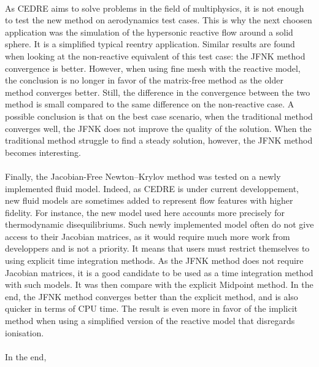   \paragraph{}
  As CEDRE aims to solve problems in the field of multiphysics, it is not enough to test the new method on aerodynamics test cases.
  This is why the next choosen application was the simulation of the hypersonic reactive flow around a solid sphere.
  It is a simplified typical reentry application.
  Similar results are found when looking at the non-reactive equivalent of this test case: the JFNK method convergence is better.
  However, when using fine mesh with the reactive model, the conclusion is no longer in favor of the matrix-free method as the older method converges better.
  Still, the difference in the convergence between the two method is small compared to the same difference on the non-reactive case.
  A possible conclusion is that on the best case scenario, when the traditional method converges well, the JFNK does not improve the quality of the solution.
  When the traditional method struggle to find a steady solution, however, the JFNK method becomes interesting.

  \paragraph{}
  Finally, the Jacobian-Free Newton--Krylov method was tested on a newly implemented fluid model.
  Indeed, as CEDRE is under current developpement, new fluid models are sometimes added to represent flow features with higher fidelity.
  For instance, the new model used here accounts more precisely for thermodynamic disequilibriums.
  Such newly implemented model often do not give access to their Jacobian matrices, as it would require much more work from developpers and is not a priority.
  It means that users must restrict themselves to using explicit time integration methods.
  As the JFNK method does not require Jacobian matrices, it is a good candidate to be used as a time integration method with such models.
  It was then compare with the explicit Midpoint method.
  In the end, the JFNK method converges better than the explicit method, and is also quicker in terms of CPU time.
  The result is even more in favor of the implicit method when using a simplified version of the reactive model that disregards ionisation.

  \paragraph{}
  In the end,
